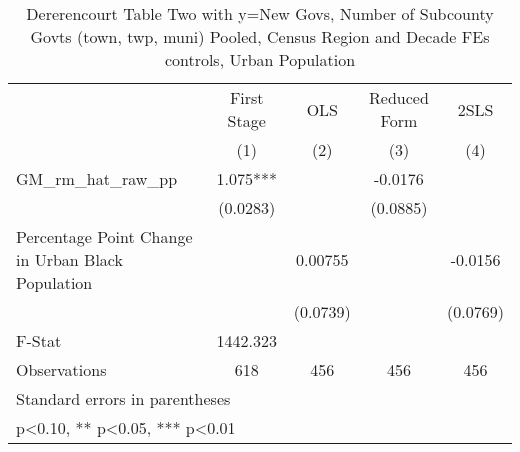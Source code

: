 \begin{table}[htbp]\centering
\def\sym#1{\ifmmode^{#1}\else\(^{#1}\)\fi}
\caption{Dererencourt Table Two with y=New Govs, Number of Subcounty Govts (town, twp, muni)  Pooled, Census Region and Decade FEs controls, Urban Population}
\begin{tabular}{l*{4}{c}}
\toprule
                    & First Stage   &         OLS   &Reduced Form   &        2SLS   \\
                    &\multicolumn{1}{c}{(1)}   &\multicolumn{1}{c}{(2)}   &\multicolumn{1}{c}{(3)}   &\multicolumn{1}{c}{(4)}   \\
\midrule
GM\_rm\_hat\_raw\_pp    &       1.075***&               &     -0.0176   &               \\
                    &    (0.0283)   &               &    (0.0885)   &               \\
\addlinespace
Percentage Point Change in Urban Black Population&               &     0.00755   &               &     -0.0156   \\
                    &               &    (0.0739)   &               &    (0.0769)   \\
\midrule
F-Stat              &    1442.323   &               &               &               \\
Observations        &         618   &         456   &         456   &         456   \\
\bottomrule
\multicolumn{5}{l}{\footnotesize Standard errors in parentheses}\\
\multicolumn{5}{l}{\footnotesize * p<0.10, ** p<0.05, *** p<0.01}\\
\end{tabular}
\end{table}

